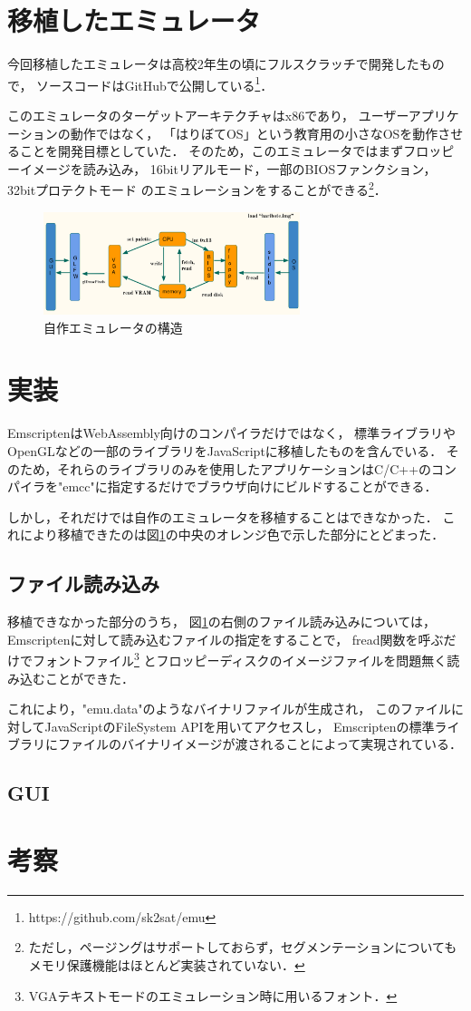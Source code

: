 \documentclass[a4j,10pt]{jsarticle}
\begin{document}
\section{移植したエミュレータ}
今回移植したエミュレータは高校2年生の頃にフルスクラッチで開発したもので，
ソースコードはGitHubで公開している\footnote{https://github.com/sk2sat/emu}．

このエミュレータのターゲットアーキテクチャはx86であり，
ユーザーアプリケーションの動作ではなく，
「はりぼてOS」という教育用の小さなOSを動作させることを開発目標としていた．
そのため，このエミュレータではまずフロッピーイメージを読み込み，
16bitリアルモード，一部のBIOSファンクション，32bitプロテクトモード
のエミュレーションをすることができる\footnote{ただし，ページングはサポートしておらず，セグメンテーションについてもメモリ保護機能はほとんど実装されていない．}．

\begin{figure}[htbp]
	\begin{center}
		\includegraphics[width=7.5cm]{./emu_struct.png}
		\caption{自作エミュレータの構造}
		\label{emustruct}
	\end{center}
\end{figure}

\section{実装}
EmscriptenはWebAssembly向けのコンパイラだけではなく，
標準ライブラリやOpenGLなどの一部のライブラリをJavaScriptに移植したものを含んでいる．
そのため，それらのライブラリのみを使用したアプリケーションはC/C++のコンパイラを"emcc"に指定するだけでブラウザ向けにビルドすることができる．

しかし，それだけでは自作のエミュレータを移植することはできなかった．
これにより移植できたのは図\ref{emustruct}の中央のオレンジ色で示した部分にとどまった．

\subsection{ファイル読み込み}
移植できなかった部分のうち，
図\ref{emustruct}の右側のファイル読み込みについては，
Emscriptenに対して読み込むファイルの指定をすることで，
fread関数を呼ぶだけでフォントファイル\footnote{VGAテキストモードのエミュレーション時に用いるフォント．}
とフロッピーディスクのイメージファイルを問題無く読み込むことができた．

これにより，"emu.data"のようなバイナリファイルが生成され，
このファイルに対してJavaScriptのFileSystem APIを用いてアクセスし，
Emscriptenの標準ライブラリにファイルのバイナリイメージが渡されることによって実現されている．

\subsection{GUI}

\section{考察}



\end{document}
